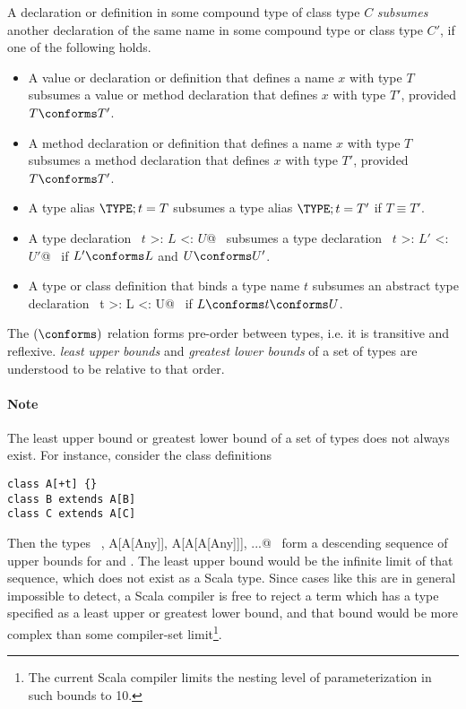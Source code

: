 A declaration or definition in some compound type of class type $C$
{\em subsumes} another
declaration of the same name in some compound type or class type $C'$, if one of the following holds.
\begin{itemize}
\item
A value or declaration or definition that defines a name $x$ with type $T$ subsumes 
a value or method declaration that defines $x$ with type $T'$, provided $T \conforms T'$.
\item 
A method declaration or definition that defines a name $x$ with type $T$ subsumes 
a method declaration that defines $x$ with type $T'$, provided $T \conforms T'$.
\item
A type alias
$\TYPE;t=T$ subsumes a type alias $\TYPE;t=T'$ if
$T \equiv T'$.
\item 
A type declaration ~\lstinline@type $t$ >: $L$ <: $U$@~ subsumes
a type declaration ~\lstinline@type $t$ >: $L'$ <: $U'$@~ if $L' \conforms L$ and 
$U \conforms U'$.
\item
A type or class definition that binds a type name $t$ subsumes an abstract
type declaration ~\lstinline@type t >: L <: U@~ if
$L \conforms t \conforms U$.
\end{itemize}

The $(\conforms)$ relation forms pre-order between types,
i.e. it is transitive and reflexive. {\em
least upper bounds} and {\em greatest lower bounds} of a set of types
are understood to be relative to that order.

\paragraph{Note} The least upper bound or greatest lower bound 
of a set of types does not always exist. For instance, consider
the class definitions
\begin{lstlisting}
class A[+t] {}
class B extends A[B] 
class C extends A[C] 
\end{lstlisting}
Then the types ~\lstinline@A[Any], A[A[Any]], A[A[A[Any]]], ...@~ form
a descending sequence of upper bounds for  and . The
least upper bound would be the infinite limit of that sequence, which
does not exist as a Scala type. Since cases like this are in general
impossible to detect, a Scala compiler is free to reject a term
which has a type specified as a least upper or greatest lower bound,
and that bound would be more complex than some compiler-set
limit\footnote{The current Scala compiler limits the nesting level
of parameterization in such bounds to 10.}.

